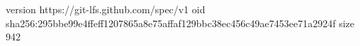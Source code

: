 version https://git-lfs.github.com/spec/v1
oid sha256:295bbe99e4ffeff1207865a8e75affaf129bbc38ec456c49ae7453ee71a2924f
size 942
